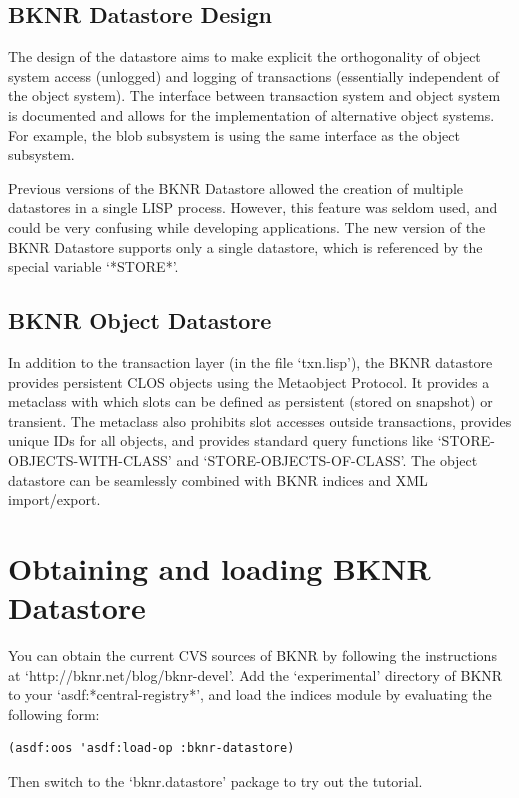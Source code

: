 \subsection{ BKNR Datastore Design}

The design of the datastore aims to make explicit the
orthogonality of object system access (unlogged) and logging of
transactions (essentially independent of the object system). The
interface between transaction system and object system is
documented and allows for the implementation of alternative object
systems. For example, the blob subsystem is using the same
interface as the object subsystem.

Previous versions of the BKNR Datastore allowed the creation of
multiple datastores in a single LISP process. However, this
feature was seldom used, and could be very confusing while
developing applications. The new version of the BKNR Datastore
supports only a single datastore, which is referenced by the
special variable `*STORE*'.



\subsection{ BKNR Object Datastore}

In addition to the transaction layer (in the file `txn.lisp'), the
BKNR datastore provides persistent CLOS objects using the
Metaobject Protocol. It provides a metaclass with which slots can
be defined as persistent (stored on snapshot) or transient. The
metaclass also prohibits slot accesses outside transactions,
provides unique IDs for all objects, and provides standard query
functions like `STORE-OBJECTS-WITH-CLASS' and
`STORE-OBJECTS-OF-CLASS'. The object datastore can be seamlessly
combined with BKNR indices and XML import/export.


\section{ Obtaining and loading BKNR Datastore}

You can obtain the current CVS sources of BKNR by following the
instructions at `http://bknr.net/blog/bknr-devel'. Add the `experimental'
directory of BKNR to your `asdf:*central-registry*', and load the
indices module by evaluating the following form:

\begin{Verbatim}[fontsize=\small,frame=leftline,framerule=0.9mm,rulecolor=\color{gray},framesep=5.1mm,xleftmargin=5mm,fontfamily=cmtt]
(asdf:oos 'asdf:load-op :bknr-datastore)
\end{Verbatim}
Then switch to the `bknr.datastore' package to try out the tutorial.

